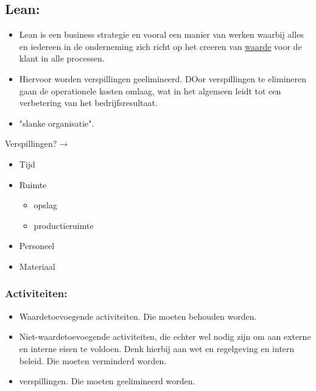 \documentclass[12pt]{article}
\begin{document}
\subsection{Lean:}
\begin{itemize}
    \item Lean is een business strategie en vooral een manier van werken waarbij alles en iedereen in de onderneming zich richt op het creeren van \underline{waarde} voor de klant in alle processen.
    \item Hiervoor worden verspillingen geelimineerd. DOor verspillingen te elimineren gaan de operationele kosten omlaag, wat in het algemeen leidt tot een verbetering van het bedrijfsresultaat.
    \item "slanke organisatie".
\end{itemize}
Verspillingen?$\rightarrow$\begin{itemize}
    \item Tijd 
    \item Ruimte\begin{itemize}
        \item opslag 
        \item productieruimte
    \end{itemize}
    \item Personeel 
    \item Materiaal
\end{itemize}
\subsubsection{Activiteiten:}
\begin{itemize}
    \item Waardetoevoegende activiteiten. Die moeten behouden worden.
    \item Niet-waardetoevoegende activiteiten, die echter wel nodig zijn om aan externe en interne eisen te voldoen. Denk hierbij aan wet en regelgeving en intern beleid. Die moeten verminderd worden.
    \item verspillingen. Die moeten geelimineerd worden.
\end{itemize}
\end{document}
